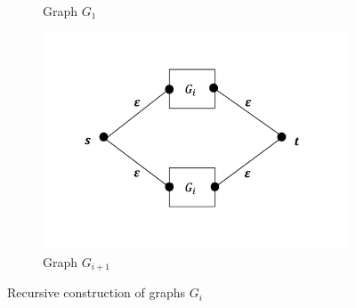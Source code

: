 \documentclass[11pt,letterpaper]{article}
\newcommand{\kctp}{$k$-CTP}
\newcommand{\mcale}{\mathcal{E}}
\newcommand{\mts}{MS}
\begin{document}
\begin{figure}[h]
\begin{subfigure}[b]{0.48\columnwidth}

\caption{Graph $G_1$}
\label{subfig:G_1}
\end{subfigure}
\begin{subfigure}[b]{0.48\columnwidth}
\includegraphics[scale=0.2]{graphics/G_i.pdf}
\caption{Graph $G_{i+1}$}
\label{subfig:G_i}
\end{subfigure}

\caption{Recursive construction of graphs $G_i$}
\label{fig:G_i}
\end{figure}


\end{document}
